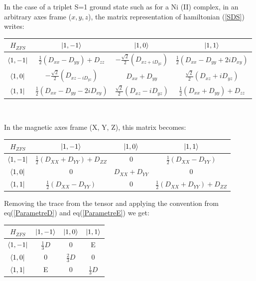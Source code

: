 \documentclass[12pt]{report}
\numberwithin{equation}{section}
\begin{document}
In the case of a triplet S=1 ground state such as for a Ni (II) complex, in an arbitrary axes frame ($x,y,z$), the matrix representation of hamiltonian (\ref{SDS}) writes:
\begin{center}
    \begin{tabular}{ c | c c c}
        $H_{ZFS}$ & $\ket{1,-1}$ & $\ket{1,0} $& $\ket{1,1}$ \\
        \hline
        $\bra{1,-1} $&  $\frac{1}{2}(D_{xx}-D_{yy})+D_{zz}$ & $-\frac{\sqrt{2}}{2}(D_{xz+iD_{yz}}) $ & $\frac{1}{2}(D_{xx}-D_{yy}+2iD_{xy})$ \\
        $\bra{1,0}$ & $-\frac{\sqrt{2}}{2}(D_{xz-iD_{yz}})  $& $ D_{xx}+D_{yy}  $&$ \frac{\sqrt{2}}{2}(D_{xz}+iD_{yz})$ \\
        $\bra{1,1} $& $ \frac{1}{2}(D_{xx}-D_{yy}-2iD_{xy}) $& $\frac{\sqrt{2}}{2}(D_{xz}-iD_{yz})$  & $\frac{1}{2}(D_{xx}+D_{yy})+D_{zz} $ \\
    \end{tabular}\\
\end{center}
In the magnetic axes frame (X, Y, Z), this matrix becomes:
\begin{center}
\begin{tabular}{c | c c c}
    $H_{ZFS}$ & $\ket{1,-1}$ & $\ket{1,0} $& $\ket{1,1}$ \\
    \hline
    $\bra{1,-1}$ & $\frac{1}{2}(D_{XX}+D_{YY})+D_{ZZ}$ & 0 & $\frac{1}{2}(D_{XX}-D_{YY})$\\
    $\bra{1,0}$ & 0 & $D_{XX}+D_{YY}$ & 0\\
    $\bra{1,1}$ &  $\frac{1}{2}(D_{XX}-D_{YY})$ & 0 & $\frac{1}{2}(D_{XX}+D_{YY})+D_{ZZ}$
\end{tabular}
\end{center}
Removing the trace from the tensor and applying the convention from eq(\ref{ParametreD}) and eq(\ref{ParametreE}) we get:
\begin{center}
\begin{tabular}{c | c c c}
    $H_{ZFS}$ & $\ket{1,-1}$ & $\ket{1,0}$ & $\ket{1,1}$\\
    \hline
    $\bra{1,-1}$ & $\frac{1}{3}D$ & 0 & E\\
    $\bra{1,0}$ & 0 & $\frac{2}{3}D $& 0\\
    $\bra{1,1}$ & E & 0 & $\frac{1}{3}D$
\end{tabular}
\end{center}
\end{document}
